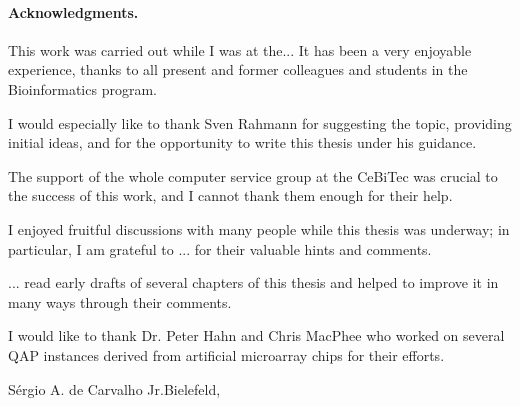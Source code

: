 \paragraph{Acknowledgments.}
This work was carried out while I was at the...
It has been a very enjoyable experience, thanks to all present and
former colleagues and students in the Bioinformatics program.

I would especially like to thank Sven Rahmann for suggesting the
topic, providing initial ideas, and for the opportunity to write this
thesis under his guidance.

The support of the whole computer service group at the CeBiTec was
crucial to the success of this work, and I cannot thank them enough
for their help.

I enjoyed fruitful discussions with many people while this thesis was
underway; in particular, I am grateful to ...
for their valuable hints and comments. 

... read early drafts of several chapters of this thesis and
helped to improve it in many ways through their comments.

I would like to thank Dr. Peter Hahn and Chris MacPhee who worked on several QAP instances
derived from artificial microarray chips for their efforts.


\vspace*{6ex}
S\'ergio A. de Carvalho Jr.\hfill Bielefeld, \handindate
